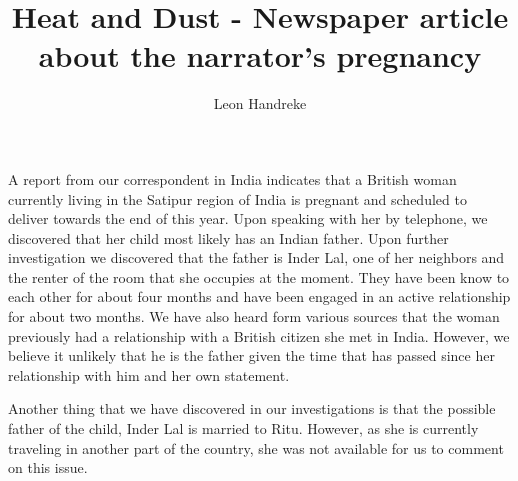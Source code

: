 \documentclass[11pt]{article}
\title{Heat and Dust - Newspaper article about the narrator's pregnancy}
\author{Leon Handreke}
\date{}                                           %
\begin{document}
\doublespacing

\maketitle
{}\selectfont

A report from our correspondent in India indicates that a British woman currently living in the Satipur region of India is pregnant and scheduled to deliver towards the end of this year.  Upon speaking with her by telephone, we discovered that her child most likely has an Indian father. Upon further investigation we discovered that the father is Inder Lal, one of her neighbors and the renter of the room that she occupies at the moment.  They have been know to each other for about four months and have been engaged in an active relationship for about two months. We have also heard form various sources that the woman previously had a relationship with a British citizen she met in India. However, we believe it unlikely that he is the father given the time that has passed since her relationship with him and her own statement.

Another thing that we have discovered in our investigations is that the possible father of the child, Inder Lal is married to Ritu. However, as she is currently traveling in another part of the country, she was not available for us to comment on this issue.
\end{document}

